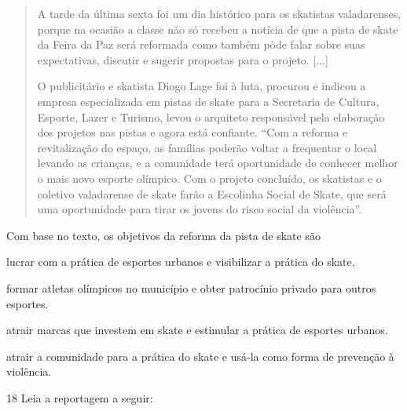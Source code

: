 \begin{quote}
A tarde da última sexta foi um dia histórico para os skatistas
valadarenses, porque na ocasião a classe não só recebeu a notícia de
que a pista de skate da Feira da Paz será reformada como também pôde
falar sobre suas expectativas, discutir e sugerir propostas para o
projeto. {[}...{]}

O publicitário e skatista Diogo Lage foi à luta, procurou e indicou a
empresa especializada em pistas de skate para a Secretaria de Cultura, Esporte, Lazer e Turismo, levou o
arquiteto responsável pela elaboração dos projetos nas pistas e agora
está confiante. ``Com a reforma e revitalização do espaço, as famílias
poderão voltar a frequentar o local levando as crianças, e a comunidade
terá oportunidade de conhecer melhor o mais novo esporte olímpico. Com o
projeto concluído, os skatistas e o coletivo valadarense de skate farão a
Escolinha Social de Skate, que será uma oportunidade para tirar os
jovens do risco social da violência''.

\end{quote}

Com base no texto, os objetivos da reforma da pista de skate são

\begin{escolha}
\item lucrar com a prática de esportes urbanos e visibilizar a prática do skate.

\item formar atletas olímpicos no município e obter patrocínio privado para outros esportes.

\item atrair marcas que investem em skate e estimular a prática de esportes urbanos. 

\item atrair a comunidade para a prática do skate e usá-la como forma de prevenção à violência.
\end{escolha}

\num{18}  Leia a reportagem a seguir:

